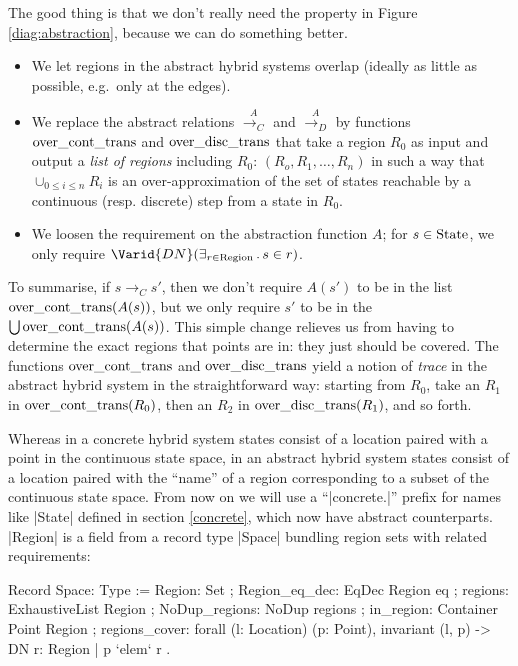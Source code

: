 \documentclass[runningheads]{llncs}
\newcommand{\Exists}[2]{\exists_{#1} \, . \, #2}
\newcommand{\State}{{\rm State}}
\newcommand{\Region}{{\rm Region}}
\newcommand{\contrans}{\rightarrow_C}
\newcommand{\acontrans}{\stackrel{A}{\rightarrow_C}}
\newcommand{\adistrans}{\stackrel{A}{\rightarrow_D}}
\newcommand{\overcontrans}{{\rm over\_cont\_trans}}
\newcommand{\overdistrans}{{\rm over\_disc\_trans}}
\begin{document}
The good thing is that we don't really need the property in Figure
\ref{diag:abstraction}, because we can do something better. 
\begin{itemize}
\item
We let regions in the abstract hybrid systems overlap (ideally as
little as possible, e.g.\ only at the edges).

\item
We replace the abstract relations $\acontrans$ and $\adistrans$ by functions $\overcontrans$ and $\overdistrans$ that take a region $R_0$
as input and output a {\em list of regions\/} including $R_0$: $(R_o,
R_1, \ldots, R_n)$ in such a way that $\cup_{0\leq i\leq n}R_i$ is an
over-approximation of the set of states reachable by a continuous (resp. discrete) step
from a state in $R_0$.\\
\item
We loosen the requirement on the abstraction function $A$; for $s \in \State$, we only require $\Varid{DN}(\Exists {r\in \Region}{s\in r})$.
\end{itemize}

To summarise, if $s\contrans s'$, then we don't require
$A(s')$ to be in the list $\overcontrans(A(s))$, but we only require
$s'$ to be in the $\bigcup \overcontrans(A(s))$. 
This simple change relieves us from having to determine the exact
regions that points are in: they just should be covered. The functions
$\overcontrans$ and $\overdistrans$ yield a notion of {\em trace\/} in
the abstract hybrid system in the straightforward way: starting from $R_0$,
take an $R_1$ in $\overcontrans( R_0)$, then an $R_2$ in
$\overdistrans(R_1)$, and so forth.

Whereas in a concrete hybrid system states consist of a location
paired with a point in the continuous state space, in an abstract
hybrid system states consist of a location paired with the ``name'' of
a region corresponding to a subset of the continuous state space.
From now on we will use a ``|concrete.|'' prefix for names like
|State| defined in section \ref{concrete}, which now have abstract
counterparts. |Region| is a field from a record type |Space| bundling
region sets with related requirements:

\begin{code}
  Record Space: Type :=
    { Region: Set
    ; Region_eq_dec: EqDec Region eq
    ; regions: ExhaustiveList Region
    ; NoDup_regions: NoDup regions
    ; in_region: Container Point Region
    ; regions_cover: forall (l: Location) (p: Point),
        invariant (l, p) -> DN { r: Region | p `elem` r }  }.
\end{code}
\end{document}
